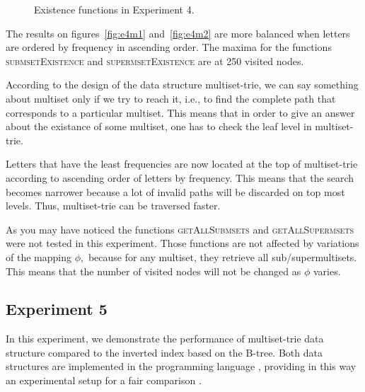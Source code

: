 \begin{figure}
\center
{}
\caption{Existence functions in Experiment 4.}
\end{figure}

%

The results on figures~\ref{fig:e4m1} and~\ref{fig:e4m2} are more balanced when 
letters are ordered by frequency in ascending order. The maxima for the functions 
\textsc{submsetExistence} and \textsc{supermsetExistence} are at 250 visited nodes. 

According to the design of the data structure multiset-trie, we can say 
something about multiset only if we try to reach it, i.e., to find the complete 
path that corresponds to a particular multiset. This means that in order to give 
an answer about the existance of some multiset, one has to check the leaf level in 
multiset-trie. 

Letters that have the least frequencies are now located at the top of 
multiset-trie according to ascending order of letters by frequency. This means 
that the search becomes narrower because a lot of invalid paths will be 
discarded on top most levels. Thus, multiset-trie can be traversed faster.

As you may have noticed the functions \textsc{getAllSubmsets} and 
\textsc{getAllSupermsets} were not tested in this experiment. Those functions 
are not affected by variations of the mapping $\phi,$ because for any multiset, 
they retrieve all sub/supermultisets. This means that the number of visited 
nodes will not be changed as $\phi$ varies.

\subsection{Experiment 5} \label{s:exp5}

In this experiment, we demonstrate the performance of multiset-trie
data structure compared to the inverted index based on the
B-tree. Both data structures are implemented in the programming
language \CC, providing in this way an experimental setup for a fair
comparison \cite{akulich2019mstrie}.

